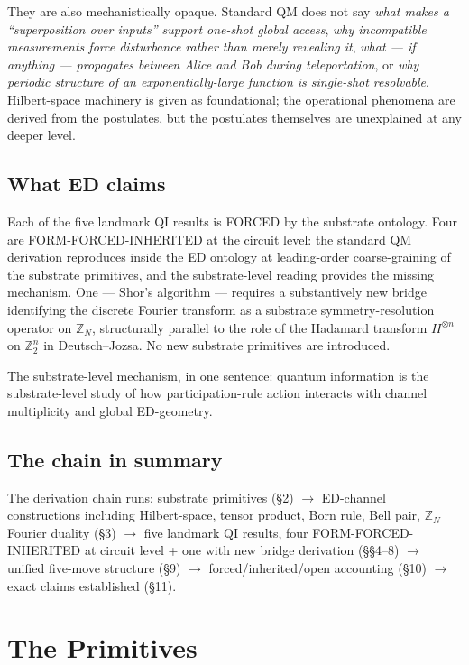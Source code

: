 \documentclass[11pt,a4paper]{article}
\begin{document}
They are also mechanistically opaque. Standard QM does not say \emph{what makes a ``superposition over inputs'' support one-shot global access}, \emph{why incompatible measurements force disturbance rather than merely revealing it}, \emph{what --- if anything --- propagates between Alice and Bob during teleportation}, or \emph{why periodic structure of an exponentially-large function is single-shot resolvable}. Hilbert-space machinery is given as foundational; the operational phenomena are derived from the postulates, but the postulates themselves are unexplained at any deeper level.

\subsection*{What ED claims}

Each of the five landmark QI results is FORCED by the substrate ontology. Four are FORM-FORCED-INHERITED at the circuit level: the standard QM derivation reproduces inside the ED ontology at leading-order coarse-graining of the substrate primitives, and the substrate-level reading provides the missing mechanism. One --- Shor's algorithm --- requires a substantively new bridge identifying the discrete Fourier transform as a substrate symmetry-resolution operator on $\mathbb{Z}_N$, structurally parallel to the role of the Hadamard transform $H^{\otimes n}$ on $\mathbb{Z}_2^n$ in Deutsch--Jozsa. No new substrate primitives are introduced.

The substrate-level mechanism, in one sentence: quantum information is the substrate-level study of how participation-rule action interacts with channel multiplicity and global ED-geometry.

\subsection*{The chain in summary}

The derivation chain runs: substrate primitives (\S2) $\to$ ED-channel constructions including Hilbert-space, tensor product, Born rule, Bell pair, $\mathbb{Z}_N$ Fourier duality (\S3) $\to$ five landmark QI results, four FORM-FORCED-INHERITED at circuit level + one with new bridge derivation (\S\S4--8) $\to$ unified five-move structure (\S9) $\to$ forced/inherited/open accounting (\S10) $\to$ exact claims established (\S11).

\section{The Primitives}
\end{document}
